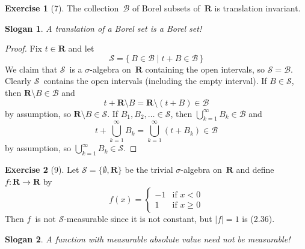 \documentclass[letterpaper,12pt]{article}
\newcommand{\R}{\mathbf{R}}
\newcommand{\B}{\mathcal{B}}
\renewcommand{\S}{\mathcal{S}}
\newcommand{\bigunion}{\bigcup}
\newcommand{\abs}[1]{|#1|}
\theoremstyle{definition}
\newtheorem*{exer}{Exercise}
\theoremstyle{remark}
\theoremstyle{plain}
\newtheorem*{slogan}{Slogan}
\begin{document}
\begin{exer}[7]
The collection~\(\B\) of Borel subsets of~\(\R\) is translation invariant.
\end{exer}
\begin{slogan}
A translation of a Borel set is a Borel set!
\end{slogan}
\begin{proof}
Fix \(t\in\R\) and let
\[\S=\{\,B\in\B\mid t+B\in\B\,\}\]
We claim that \(\S\)~is a \(\sigma\)-algebra on~\(\R\) containing the open intervals, so \(\S=\B\). Clearly \(\S\)~contains the open intervals (including the empty interval). If \(B\in\S\), then \(\R\setminus B\in\B\) and
\[t+\R\setminus B=\R\setminus(t+B)\in\B\]
by assumption, so \(\R\setminus B\in\S\). If \(B_1,B_2,\ldots\in\S\), then \(\bigunion_{k=1}^{\infty} B_k\in\B\) and
\[t+\bigunion_{k=1}^{\infty}B_k=\bigunion_{k=1}^{\infty}(t+B_k)\in\B\]
by assumption, so \(\bigunion_{k=1}^{\infty}B_k\in\S\).
\end{proof}

\begin{exer}[9]
Let \(\S=\{\emptyset,\R\}\) be the trivial \(\sigma\)-algebra on~\(\R\) and define \(f:\R\to\R\) by
\[f(x)=\begin{cases}
-1&\text{if }x<0\\
1&\text{if }x\ge 0
\end{cases}\]
Then \(f\)~is not \(\S\)-measurable since it is not constant, but \(\abs{f}=1\) is (2.36).
\end{exer}
\begin{slogan}
A function with measurable absolute value need not be measurable!
\end{slogan}
\end{document}

